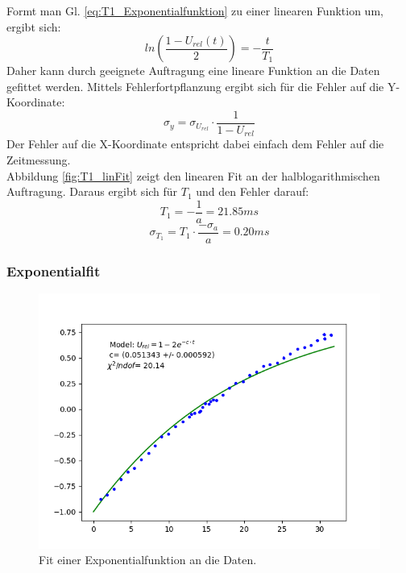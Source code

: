 \documentclass[12pt,a4paper]{article}
\begin{document}
Formt man Gl. \ref{eq:T1_Exponentialfunktion} zu einer linearen Funktion um, ergibt sich:
\begin{equation}
ln\left(\dfrac{1 - U_{rel} (t)}{2}\right) = -\dfrac{t}{T_1}
\label{eq:T1_linFunktion}
\end{equation}
Daher kann durch geeignete Auftragung eine lineare Funktion an die Daten gefittet werden. Mittels Fehlerfortpflanzung ergibt sich für die Fehler auf die Y-Koordinate:
\begin{equation}
\sigma _y = \sigma _{U_{rel}} \cdot \dfrac{1}{1 - U_{rel}}
\end{equation}
Der Fehler auf die X-Koordinate entspricht dabei einfach dem Fehler auf die Zeitmessung.\\
Abbildung \ref{fig:T1_linFit} zeigt den linearen Fit an der halblogarithmischen Auftragung. Daraus ergibt sich für $T_1$ und den Fehler darauf:
\begin{equation*}
T_1 = -\dfrac{1}{a} = 21.85 ms
\end{equation*}
\begin{equation*}
\sigma _{T_1} = T_1 \cdot \dfrac{-\sigma _a}{a} = 0.20 ms
\end{equation*}

\subsubsection{Exponentialfit}

\begin{figure}
\centering
\includegraphics[scale=0.7]{Bilder/T1_expFit.PNG}
\caption{Fit einer Exponentialfunktion an die Daten.}
\label{fig:T1_expFit}
\end{figure}
\end{document}
